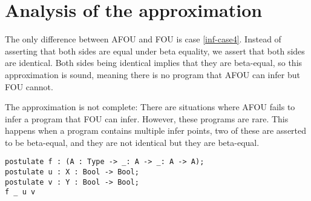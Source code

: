 \section{Analysis of the approximation}
\label{analysing-inference}

The only difference between AFOU and FOU is case \ref{inf-case4}. Instead of asserting that both sides are equal under beta equality, we assert that both sides are identical. Both sides being identical implies that they are beta-equal, so this approximation is sound, meaning there is no program that AFOU can infer but FOU cannot. 

The approximation is not complete: There are situations where AFOU fails to infer a program that FOU can infer. However, these programs are rare. This happens when a program contains multiple infer points, two of these are asserted to be beta-equal, and they are not identical but they are beta-equal. 

\begin{lstlisting}
postulate f : (A : Type -> _: A -> _: A -> A);
postulate u : X : Bool -> Bool;
postulate v : Y : Bool -> Bool;
f _ u v
\end{lstlisting}


